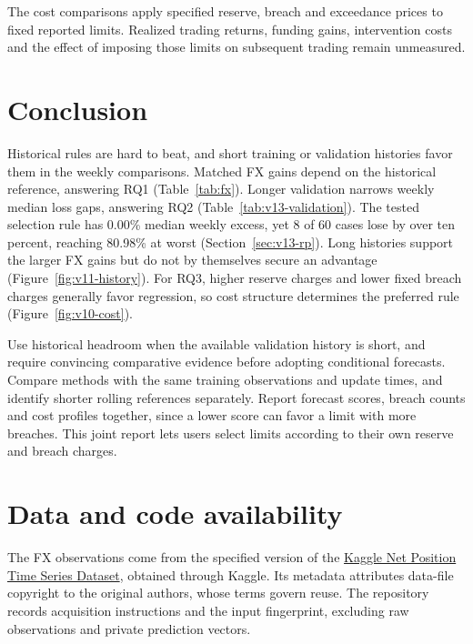\documentclass[12pt,a4paper]{article}
\begin{document}
The cost comparisons apply specified reserve, breach and exceedance prices to fixed reported limits. Realized trading returns, funding gains, intervention costs and the effect of imposing those limits on subsequent trading remain unmeasured.

\FloatBarrier

\section{Conclusion}\label{sec:conclusion}

Historical rules are hard to beat, and short training or validation histories favor them in the weekly comparisons. Matched FX gains depend on the historical reference, answering RQ1 (Table~\ref{tab:fx}). Longer validation narrows weekly median loss gaps, answering RQ2 (Table~\ref{tab:v13-validation}). The tested selection rule has 0.00\% median weekly excess, yet 8 of 60 cases lose by over ten percent, reaching 80.98\% at worst (Section~\ref{sec:v13-rp}). Long histories support the larger FX gains but do not by themselves secure an advantage (Figure~\ref{fig:v11-history}). For RQ3, higher reserve charges and lower fixed breach charges generally favor regression, so cost structure determines the preferred rule (Figure~\ref{fig:v10-cost}).

Use historical headroom when the available validation history is short, and require convincing comparative evidence before adopting conditional forecasts. Compare methods with the same training observations and update times, and identify shorter rolling references separately. Report forecast scores, breach counts and cost profiles together, since a lower score can favor a limit with more breaches. This joint report lets users select limits according to their own reserve and breach charges.

\FloatBarrier

\section*{Data and code availability}
The FX observations come from the specified version of the \href{https://www.kaggle.com/datasets/davidlindsay1979/net-position-time-series-dataset}{Kaggle Net Position Time Series Dataset}, obtained through Kaggle. Its metadata attributes data-file copyright to the original authors, whose terms govern reuse. The repository records acquisition instructions and the input fingerprint, excluding raw observations and private prediction vectors.
\end{document}
